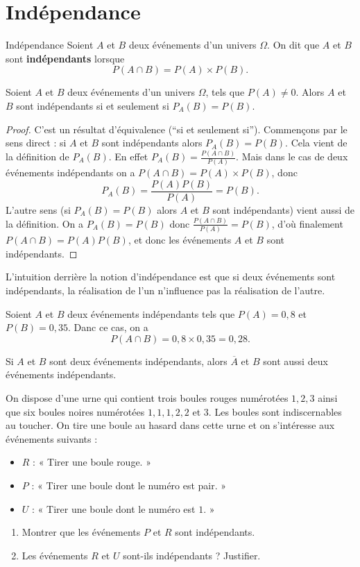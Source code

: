 \documentclass[11pt]{article}
\begin{document}
\section{Indépendance}
\begin{defi}{Indépendance}
  Soient $A$ et $B$ deux événements d'un univers $\Omega$. On dit que $A$ et $B$
  sont \textbf{indépendants} lorsque
  \[
    P(A\cap B) = P(A)\times P(B).
  \]
\end{defi}
\begin{prop}
  Soient $A$ et $B$ deux événements d'un univers $\Omega$, tels que $P(A)\neq0$.
  Alors $A$ et $B$ sont indépendants si et seulement si $P_A(B)=P(B)$.
\end{prop}
\begin{proof}
  C'est un résultat d'équivalence (``si et seulement si''). Commençons par le
  sens direct : si $A$ et $B$ sont indépendants alors $P_A(B)=P(B)$. Cela vient de la définition de $P_A(B)$. En effet $P_A(B)=\frac{P(A\cap
  B)}{P(A)}$. Mais dans le cas de deux événements indépendants on a
  $P(A\cap B)=P(A)\times P(B)$, donc
  \[
    P_A(B)=\frac{P(A)P(B)}{P(A)}=P(B).
  \]
  L'autre sens (si $P_A(B)=P(B)$ alors $A$ et $B$ sont indépendants) vient aussi
  de la définition. On a $P_A(B)=P(B)$ donc $\frac{P(A\cap B)}{P(A)}=P(B)$, d'où
  finalement $P(A\cap B)=P(A)P(B)$, et donc les événements $A$ et $B$ sont
  indépendants.
\end{proof}
\begin{rmq}
  L'intuition derrière la notion d'indépendance est que si deux événements sont
  indépendants, la réalisation de l'un n'influence pas la réalisation
  de l'autre.
\end{rmq}
\begin{exemple}
  Soient $A$ et $B$ deux événements indépendants tels que $P(A)=0,8$ et
  $P(B)=0,35$. Danc ce cas, on a
  \[
    P(A\cap B) = 0,8\times0,35=0,28.
  \]
\end{exemple}
\begin{propadm}
  Si $A$ et $B$ sont deux événements indépendants, alors $\overline A$ et $B$
  sont aussi deux événements indépendants.
\end{propadm}
\begin{app}
  On dispose d'une urne qui contient trois boules rouges numérotées $1, 2, 3$
  ainsi que six boules noires numérotées $1, 1, 1, 2, 2$ et $3$. Les boules sont
  indiscernables au toucher. On tire une boule au hasard dans cette urne et on
  s'intéresse aux événements suivants :
  \begin{itemize}
    \item $R$ : « Tirer une boule rouge. »
    \item $P$ : « Tirer une boule dont le numéro est pair. »
    \item $U$ : « Tirer une boule dont le numéro est $1$. »
  \end{itemize}
  \begin{enumerate}
    \item Montrer que les événements $P$ et $R$ sont indépendants.
    \item Les événements $R$ et $U$ sont-ils indépendants ? Justifier.
  \end{enumerate}
\end{app}
\end{document}
